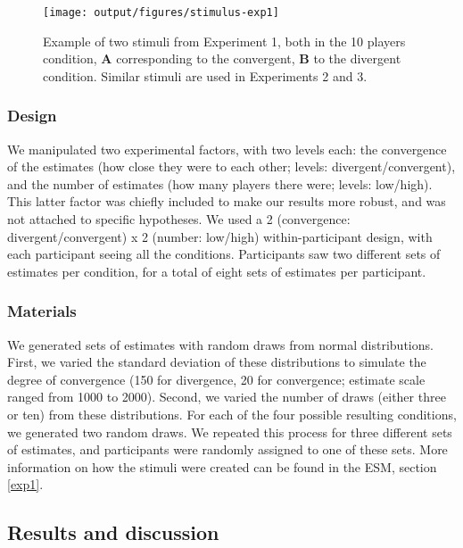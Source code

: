 \documentclass[
  doc,floatsintext]{apa6}
\begin{document}
\begin{figure}

\texttt{[image: output/figures/stimulus-exp1]} \hfill{}

\caption{Example of two stimuli from Experiment 1, both in the 10 players condition, \textbf{A} corresponding to the convergent, \textbf{B} to the divergent condition. Similar stimuli are used in Experiments 2 and 3.}\label{fig:stimulus-exp1}
\end{figure}

\subsubsection{Design}\label{design}

We manipulated two experimental factors, with two levels each: the convergence of the estimates (how close they were to each other; levels: divergent/convergent), and the number of estimates (how many players there were; levels: low/high). This latter factor was chiefly included to make our results more robust, and was not attached to specific hypotheses. We used a 2 (convergence: divergent/convergent) x 2 (number: low/high) within-participant design, with each participant seeing all the conditions. Participants saw two different sets of estimates per condition, for a total of eight sets of estimates per participant.

\subsubsection{Materials}\label{materials}

We generated sets of estimates with random draws from normal distributions. First, we varied the standard deviation of these distributions to simulate the degree of convergence (150 for divergence, 20 for convergence; estimate scale ranged from 1000 to 2000). Second, we varied the number of draws (either three or ten) from these distributions. For each of the four possible resulting conditions, we generated two random draws. We repeated this process for three different sets of estimates, and participants were randomly assigned to one of these sets. More information on how the stimuli were created can be found in the ESM, section \ref{exp1}.

\subsection{Results and discussion}\label{results-and-discussion}
\end{document}
